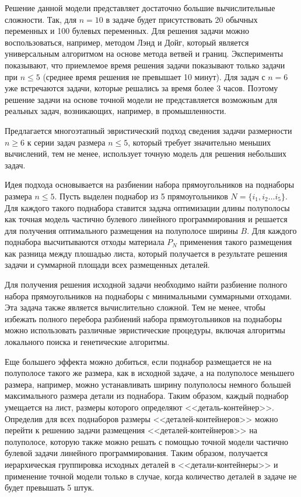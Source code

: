 Решение данной модели представляет достаточно большие вычислительные сложности. Так, для $n=10$ в задаче будет присутствовать 20 обычных переменных и 100 булевых переменных. Для решения задачи можно воспользоваться, например, методом Лэнд и Дойг, который является универсальным алгоритмом на основе метода ветвей и границ. Эксперименты показывают, что приемлемое время решения задачи показывают только задачи при $n\le 5$ (среднее время решения не превышает 10 минут). Для задач с $n=6$ уже встречаются задачи, которые решались за время более 3 часов. Поэтому решение задачи на основе точной модели не представляется возможным для реальных задач, возникающих, например, в промышленности.

Предлагается многоэтапный эвристический подход сведения задачи размерности $n\ge 6$ к серии задач размера $n\le 5$, который требует значительно меньших вычислений, тем не менее, использует точную модель для решения небольших задач.

Идея подхода основывается на разбиении набора прямоугольников на поднаборы размера $n\le 5$. Пусть выделен поднабор из 5 прямоугольников $N=\{i_1, i_2\ldots i_5\}$. Для каждого такого поднабора ставится задача оптимизации длины полуполосы как точная модель частично булевого линейного программирования и решается для получения оптимального размещения на полуполосе ширины $B$. Для каждого поднабора высчитываются отходы материала $P_N$ применения такого размещения как разница между плошадью листа, который получается в результате решения задачи и суммарной площади всех размещенных  деталей. 

Для получения решения исходной задачи необходимо найти разбиение полного набора прямоугольников на поднаборы с минимальными суммарными отходами. Эта задача также является вычислительно сложной. Тем не менее, чтобы избежать полного перебора разбиений набора прямоугольников на поднаборы можно использовать различные эвристические процедуры, включая алгоритмы локального поиска и генетические алгоритмы. 

Еще большего эффекта можно добиться, если поднабор размещается не на полуполосе такого же размера, как в исходной задаче, а на полуполосе меньшего размера, например, можно устанавливать ширину полуполосы немного большей максимального размера детали из поднабора. Таким образом, каждый поднабор умещается на лист, размеры которого определяют <<деталь-контейнер>>. Определив для всех поднаборов размеры <<деталей-контейнеров>> можно перейти к решению задачи размещения <<деталей-контейнеров>> на полуполосе, которую также можно решать с помощью точной модели частично булевой задачи линейного программирования. Таким образом, получается иерархическая группировка исходных деталей в <<детали-контейнеры>> и применение точной модели только в случае, когда количество деталей в задаче не будет превышать 5 штук.

